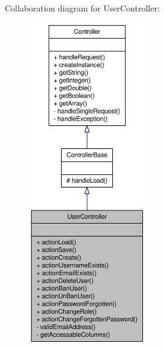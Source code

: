 Collaboration diagram for UserController:\nopagebreak
\begin{figure}[H]
\begin{center}
\leavevmode
\includegraphics[height=400pt]{classUserController__coll__graph}
\end{center}
\end{figure}
